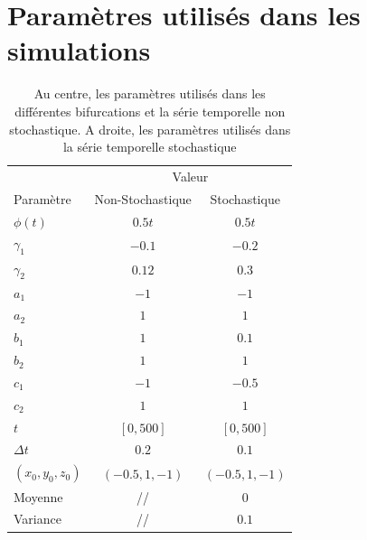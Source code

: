 \section{Paramètres utilisés dans les simulations}
\begin{table}[H]
\centering
\begin{tabular}{lcc} \toprule
  & \multicolumn {2}{c}{Valeur} \\\cmidrule(lr) {2-3}
  Paramètre         & Non-Stochastique                & Stochastique\\\hline
  $\phi(t)$         & $0.5t$                          & $0.5t$ \\
  $\gamma_1$        & $-0.1$                          & $-0.2$ \\
  $\gamma_2$        & $0.12$                          & $0.3$ \\
  $a_1$             & $-1$                            & $-1$ \\
  $a_2$             & $1$                             & $1$ \\
  $b_1$             & $1$                             & $0.1$ \\
  $b_2$             & $1$                             & $1$ \\
  $c_1$             & $-1$                            & $-0.5$ \\
  $c_2$             & $1$                             & $1$ \\
  $t$               & $[0, 500]$                      & $[0, 500]$ \\
  $\Delta t$        & $0.2$                           & $0.1$ \\
  $(x_0, y_0, z_0)$ & $(-0.5, 1, -1)$                 & $(-0.5, 1, -1)$ \\
  Moyenne           & //                              & $0$ \\
  Variance          & //                              & $0.1$ \\\hline
\end{tabular}
\caption{Au centre, les paramètres utilisés dans les différentes bifurcations et la série temporelle non stochastique. A droite, les paramètres utilisés dans la série temporelle stochastique}
\label{tab:parameters}
\end{table}
